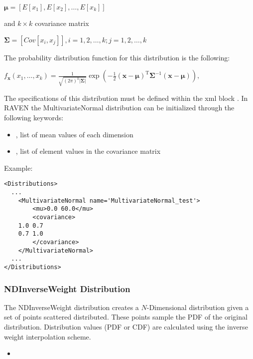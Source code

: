 $\boldsymbol\mu= [E[x_1], E[x_2], …, E[x_k]]$

and $k \times k$ covariance matrix

$\boldsymbol\Sigma = [Cov[x_i,x_j]] , i=1,2,\ldots,k ; j=1,2,\ldots,k$

The probability distribution function for this distribution is the following:

$
f_{\mathbf x}(x_1,\ldots,x_k) =
\frac{1}{\sqrt{(2\pi)^k|\boldsymbol\Sigma|}}
\exp\left(-\frac{1}{2}({\mathbf x}-{\boldsymbol\mu})^\mathrm{T}{\boldsymbol\Sigma}^{-1}({\mathbf x}-{\boldsymbol\mu})
\right),
$

The specifications of this distribution must be defined within the xml block .  In RAVEN the MultivariateNormal distribution can be initialized through the following keywords:
\begin{itemize}
\item {}, list of mean values of each dimension
\item {}, list of element values in the covariance matrix
\end{itemize}

Example:
\begin{lstlisting}[style=XML]
<Distributions>
  ...
    <MultivariateNormal name='MultivariateNormal_test'>
        <mu>0.0 60.0</mu>
        <covariance>
	1.0 0.7
	0.7 1.0
        </covariance>
    </MultivariateNormal>
  ...
</Distributions>
\end{lstlisting}


\subsubsection{NDInverseWeight Distribution}
\label{NDInverseWeight}
The NDInverseWeight distribution creates a $N$-Dimensional distribution given a set of points
scattered distributed. These points sample the PDF of the original distribution.
Distribution values (PDF or CDF) are calculated using the inverse weight
interpolation scheme.

%
\attrsIntro
\vspace{-5mm}
\begin{itemize}
\itemsep0em
\item \nameDescription
\end{itemize}
\vspace{-5mm}


